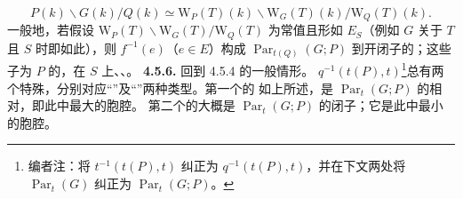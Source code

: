 \[P(k)\backslash G(k)/Q(k)\simeq\mathrm W_P(T)(k)\backslash\mathrm W_G(T)(k)/\mathrm W_Q(T)(k).\]
一般地，若假设 $\mathrm W_P(T)\backslash\mathrm W_G(T)/\mathrm W_Q(T)$ 为常值且形如 $E_S$（例如 $G$ 关于 $T$ 且 $S$ 时即如此），则 $f^{-1}(e)$（$e\in E$）构成 $\operatorname{Par}_{t(Q)}(G;P)$ 到开闭子的；这些子为 $P$ 的，在 $S$ 上、、。
\textbf{4.5.6.} 回到 4.5.4 的一般情形。 $q^{-1}(t(P),t)$\footnote{编者注：将 $t^{-1}(t(P),t)$ 纠正为 $q^{-1}(t(P),t)$，并在下文两处将 $\operatorname{Par}_t(G)$ 纠正为 $\operatorname{Par}_t(G;P)$。}总有两个特殊，分别对应“”及“”两种类型。第一个的
如上所述，是 $\operatorname{Par}_t(G;P)$ 的相对，即此中最大的胞腔。
第二个的大概是 $\operatorname{Par}_t(G;P)$ 的闭子；它是此中最小的胞腔。

